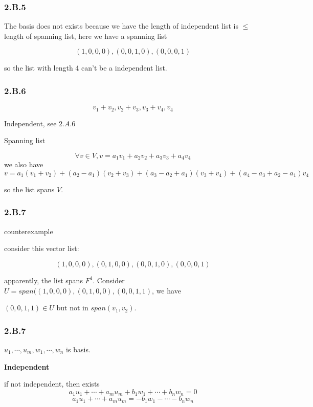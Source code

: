 \subsubsection*{2.B.5}

The basis does not exists because we have the length of independent list is $\leq$ length of spanning list, here we have a spanning list

\[(1, 0, 0, 0), (0, 0, 1, 0), (0,0,0, 1)\] 

so the list with length 4 can't be a independent list.

\subsubsection*{2.B.6}

\[v_{1}+v_{2}, v_{2}+v_{3}, v_{3}+v_{4}, v_{4}\]

Independent, see $2.A.6$

Spanning list

\[ \forall v\in V, v =  a_{1}v_{1} + a_{2}v_{2} + a_{3}v_{3} + a_{4}v_{4}\]
we also have 
\[ v = a_{1}(v_{1} + v_{2}) + (a_{2} - a_{1})(v_{2} + v_{3}) + (a_{3} -a_{2}+a_{1})(v_{3}+v_{4}) + (a_{4} - a_{3} + a_{2}-a_{1})v_{4} \]

so the list spans $V$.

\subsubsection*{2.B.7}

counterexample

consider this vector list:

\[(1,0,0,0), (0,1,0,0),(0,0,1,0),(0,0,0,1)\]

apparently, the list spans $F^{4}$. Consider $U=span((1,0,0,0), (0,1,0,0), (0,0,1,1)$, we have

$(0,0,1,1) \in U$ but not in $span(v_{1}, v_{2})$.


\subsubsection*{2.B.7}

$u_{1},\cdots, u_{m}, w_{1}, \cdots,w_{n}$ is basis.

\textbf{Independent}

if not independent, then exists
\[a_{1}u_{1}+\cdots+a_{m}u_{m} + b_{1}w_{1} + \cdots +b_{n}w_{n} = 0\]
\[a_{1}u_{1}+\cdots+a_{m}u_{m} = -b_{1}w_{1} - \cdots -b_{n}w_{n}\]

